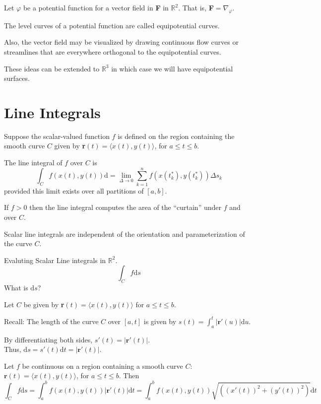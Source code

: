 \documentclass[../calc3.tex]{subfiles}
\begin{document}
\begin{definition}
    Let $\varphi$ be a potential function for a vector field in \textbf{F} in $\mathbb{R}^2$. That is, \textbf{F}$=\nabla_{\varphi}$.

    The level curves of a potential function are called equipotential curves.

    Also, the vector field may be visualized by drawing continuous flow curves or streamlines 
    that are everywhere orthogonal to the equipotential curves.

    These ideas can be extended to $\mathbb{R}^3$ in which case we will have equipotential surfaces.
\end{definition}

\section{Line Integrals}
\begin{definition}
    Suppose the scalar-valued function $f$ is defined on the region containing the smooth curve 
    $C$ given by \textbf{r}$(t)=\langle x(t),y(t) \rangle$, for $a\leq t\leq b$.

    The line integral of $f$ over $C$ is 
    \[\int_C f(x(t),y(t))\mathrm{d} = \lim_{\Delta \to 0} \sum^n_{k=1}f(x(t^*_k),y(t_k^*))\Delta s_k\]
    provided this limit exists over all partitions of $[a,b]$.

    If $f>0$ then the line integral computes the area of the ``curtain'' under $f$ and over $C$.
\end{definition}
Scalar line integrals are independent of the orientation and parameterization of the curve $C$.

Evaluting Scalar Line integrals in $\mathbb{R}^2$.
\[\int_C f\mathrm{d}s\]
What is $\mathrm{d}s$?

Let $C$ be given by \textbf{r}$(t)=\langle x(t),y(t) \rangle$ for $a\leq t\leq b$.

Recall: The length of the curve $C$ over $[a,t]$ is given by $s(t)=\int_a^t |\textbf{r}'(u)|\mathrm{d}u$.

By differentiating both sides, $s'(t)=|\textbf{r}'(t)|$.\\
Thus, $\mathrm{d}s = s'(t)\mathrm{d}t = |\textbf{r}'(t)|$.
\pagebreak
\begin{theorem}
    Let $f$ be continuous on a region containing a smooth curve $C$: $\textbf{r}(t)=\langle x(t),y(t)\rangle$, for $a\leq t\leq b$. Then 
    \[\int_C f\mathrm{d}s = \int_a^b f(x(t),y(t))|\textbf{r}'(t)|\mathrm{d}t = \int_a^b f(x(t),y(t))\sqrt{((x'(t))^2+(y'(t))^2)}\mathrm{d}t\]
\end{theorem}
\end{document}
